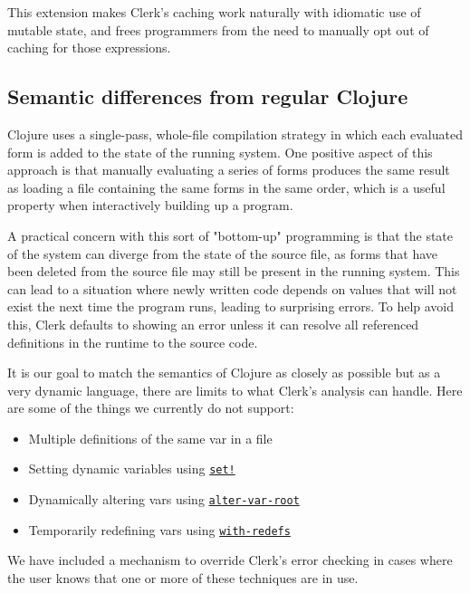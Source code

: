 \documentclass[sigconf,screen]{acmart}
\newcommand{\passthrough}[1]{#1}
\providecommand{\tightlist}{%
  \setlength{\itemsep}{0pt}\setlength{\parskip}{0pt}}
\begin{document}
This extension makes Clerk's caching work naturally with idiomatic use of mutable state, and frees programmers from the need to manually opt out of caching for those expressions.

\hypertarget{id}{%
\subsection{Semantic differences from regular Clojure}\label{id}}

Clojure uses a single-pass, whole-file compilation strategy in which each evaluated form is added to the state of the running system. One positive aspect of this approach is that manually evaluating a series of forms produces the same result as loading a file containing the same forms in the same order, which is a useful property when interactively building up a program.

A practical concern with this sort of "bottom-up" programming is that the state of the system can diverge from the state of the source file, as forms that have been deleted from the source file may still be present in the running system. This can lead to a situation where newly written code depends on values that will not exist the next time the program runs, leading to surprising errors. To help avoid this, Clerk defaults to showing an error unless it can resolve all referenced definitions in the runtime to the source code.

It is our goal to match the semantics of Clojure as closely as possible but as a very dynamic language, there are limits to what Clerk's analysis can handle. Here are some of the things we currently do not support:

\begin{itemize}
\tightlist
\item
  Multiple definitions of the same var in a file
\item
  Setting dynamic variables using \href{https://clojuredocs.org/clojure.core/set!}{\passthrough{\lstinline"set!"}}
\item
  Dynamically altering vars using \href{https://clojuredocs.org/clojure.core/alter-var-root}{\passthrough{\lstinline!alter-var-root!}}
\item
  Temporarily redefining vars using \href{https://clojuredocs.org/clojure.core/with-redefs}{\passthrough{\lstinline!with-redefs!}}
\end{itemize}

We have included a mechanism to override Clerk's error checking in cases where the user knows that one or more of these techniques are in use.
\end{document}
